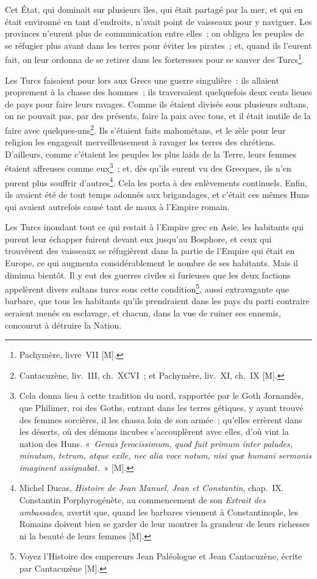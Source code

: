 \documentclass[french,twoside]{book} %
\begin{document}
Cet État, qui dominait sur plusieurs îles, qui était partagé par la mer, et qui en était environné en tant d’endroits, n’avait point de vaisseaux pour y naviguer. Les provinces n’eurent plus de communication entre elles ; on obligea les peuples de se réfugier plus avant dans les terres pour éviter les pirates ; et, quand ils l’eurent fait, on leur ordonna de se retirer dans les forteresses pour se sauver des Turcs\footnote{Pachymère, livre VII [M].}.\par
Les Turcs faisaient pour lors aux Grecs une guerre singulière : ils allaient proprement à la chasse des hommes ; ils traversaient quelquefois deux cents lieues de pays pour faire leurs ravages. Comme ils étaient divisés sous plusieurs sultans, on ne pouvait pas, par des présents, faire la paix avec tous, et il était inutile de la faire avec quelques-uns\footnote{Cantacuzène, liv. III, ch. XCVI ; et Pachymère, liv. XI, ch. IX [M].}. Ils s’étaient faits mahométans, et le zèle pour leur religion les engageait merveilleusement à ravager les terres des chrétiens. D’ailleurs, comme c’étaient les peuples les plus laids de la Terre, leurs femmes étaient affreuses comme eux\footnote{Cela donna lieu à cette tradition du nord, rapportée par le Goth Jornandès, que Philimer, roi des Goths, entrant dans les terres gétiques, y ayant trouvé des femmes sorcières, il les chassa loin de son armée ; qu’elles errèrent dans les déserts, où des démons incubes s’accouplèrent avec elles, d’où vint la nation des Huns. « {\itshape Genus ferocissimum, quod fuit primum inter paludes, minutum, tetrum, atque exile, nec alia voce notum, nisi quæ humani sermonis imaginent assignabat.} » [M].} ; et, dès qu’ils eurent vu des Grecques, ils n’en purent plus souffrir d’autres\footnote{Michel Ducas, {\itshape Histoire de Jean Manuel, Jean et Constantin}, chap. IX. Constantin Porphyrogénète, au commencement de son {\itshape Extrait des ambassades}, avertit que, quand les barbares viennent à Constantinople, les Romains doivent bien se garder de leur montrer la grandeur de leurs richesses ni la beauté de leurs femmes [M].}. Cela les porta à des enlèvements continuels. Enfin, ils avaient été de tout temps adonnés aux brigandages, et c’était ces mêmes Huns qui avaient autrefois causé tant de maux à l’Empire romain.\par
Les Turcs inondant tout ce qui restait à l’Empire grec en Asie, les habitants qui purent leur échapper fuirent devant eux jusqu’au Bosphore, et ceux qui trouvèrent des vaisseaux se réfugièrent dans la partie de l’Empire qui était en Europe, ce qui augmenta considérablement le nombre de ses habitants. Mais il diminua bientôt. Il y eut des guerres civiles si furieuses que les deux factions appelèrent divers sultans turcs sous cette condition\footnote{Voyez l’Histoire des empereurs Jean Paléologue et Jean Cantacuzène, écrite par Cantacuzène [M].}, aussi extravagante que barbare, que tous les habitants qu’ils prendraient dans les pays du parti contraire seraient menés en esclavage, et chacun, dans la vue de ruiner ses ennemis, concourut à détruire la Nation.\par
\end{document}
